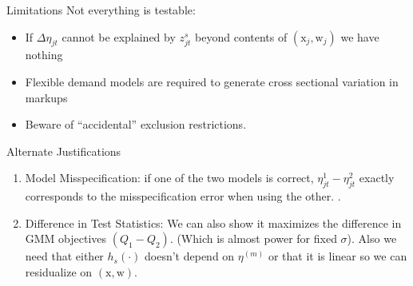 \documentclass[xcolor=pdftex,dvipsnames,table,mathserif,aspectratio=169]{beamer}
\begin{document}
\begin{frame}[plain]{Limitations}
Not everything is testable:
\begin{itemize}
\item If $\Delta \eta_{jt}$ cannot be explained by $z_{jt}^s$ beyond contents of $(\mathrm{x}_j,\mathrm{w}_j)$ we have nothing
\item Flexible demand models are required to generate cross sectional variation in markups
\item Beware of ``accidental'' exclusion restrictions.
\end{itemize}
\end{frame}

\begin{frame}[plain,label=advantages]{Alternate Justifications}
\begin{enumerate}
\item Model Misspecification: if one of the two models is correct, $\eta^1_{jt}-\eta_{jt}^2$ exactly corresponds to the misspecification error when using the other. \hyperlink{misspecification}{}. 
\item Difference in Test Statistics: We can also show it maximizes the difference in GMM objectives $(Q_1 - Q_2)$. (Which is almost power for fixed $\sigma$). Also we need that either $h_s(\cdot)$ doesn't depend on $\eta^{(m)}$ or that it is linear so we can residualize on $(\textrm{x},\text{w})$.
\end{enumerate}
\end{frame}
\end{document}

